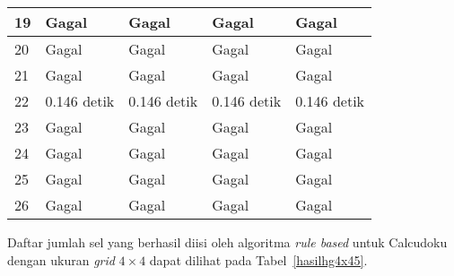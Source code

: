 \begin{table}
\begin{tabular}{| l | l | l | l | l |}
\hline
19 & Gagal & Gagal & Gagal & Gagal \\
\hline
20 & Gagal & Gagal & Gagal & Gagal \\
\hline
21 & Gagal & Gagal & Gagal & Gagal \\
\hline
22 & 0.146 detik & 0.146 detik & 0.146 detik & 0.146 detik \\
\hline
23 & Gagal & Gagal & Gagal & Gagal \\
\hline
24 & Gagal & Gagal & Gagal & Gagal \\
\hline
25 & Gagal & Gagal & Gagal & Gagal \\
\hline
26 & Gagal & Gagal & Gagal & Gagal \\
\hline
\end{tabular}
\label{tab:hasilhg5x54}
\end{table}

Daftar jumlah sel yang berhasil diisi oleh algoritma \textit{rule based} untuk Calcudoku dengan ukuran \textit{grid} \begin{math}4 \times 4\end{math} dapat dilihat pada Tabel~\ref{hasilhg4x45}.


